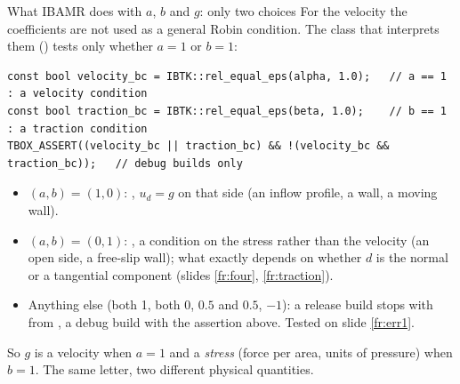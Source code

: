 \documentclass[aspectratio=169,11pt]{beamer}
\begin{document}
\begin{frame}[fragile]{What IBAMR does with $a$, $b$ and $g$: only two choices}
\label{fr:accept}
\small For the velocity the coefficients are not used as a general Robin condition. The class that interprets them () tests only whether $a = 1$ or $b = 1$:
\begin{lstlisting}[style=cpp]
const bool velocity_bc = IBTK::rel_equal_eps(alpha, 1.0);   // a == 1 : a velocity condition
const bool traction_bc = IBTK::rel_equal_eps(beta, 1.0);    // b == 1 : a traction condition
TBOX_ASSERT((velocity_bc || traction_bc) && !(velocity_bc && traction_bc));   // debug builds only
\end{lstlisting}
\begin{itemize}
  \item $(a, b) = (1, 0)$: , $u_d = g$ on that side (an inflow profile, a wall, a moving wall).
  \item $(a, b) = (0, 1)$: , a condition on the stress rather than the velocity (an open side, a free-slip wall); what exactly depends on whether $d$ is the normal or a tangential component (slides \ref{fr:four}, \ref{fr:traction}).
  \item Anything else (both 1, both 0, $0.5$ and $0.5$, $-1$): a release build stops with  from , a debug build with the assertion above. Tested on slide \ref{fr:err1}.
\end{itemize}
\begin{punchbox}
\small So $g$ is a velocity when $a = 1$ and a \emph{stress} (force per area, units of pressure) when $b = 1$. The same letter, two different physical quantities.
\end{punchbox}
\end{frame}
\end{document}
